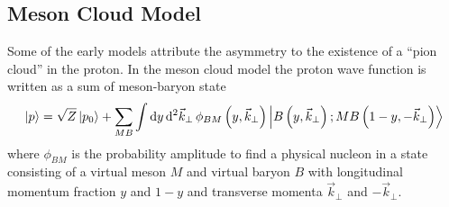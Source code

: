 \documentclass[../main.tex]{subfiles}
\begin{document}
\subsection{Meson Cloud Model}
Some of the early models attribute the asymmetry to the existence of a ``pion cloud'' in the proton.
In the meson cloud model \cite{kumano1998} the proton wave function is written as a sum of meson-baryon state
\begin{equation}
	\ket{p} = \sqrt{Z}\ket{p_0} + \sum_{MB}\int \dd{y} \dd[2]{\vec{k}_\perp} \phi_{BM} \left(y, \vec{k}_\perp\right)\ket{B\left(y, \vec{k}_\perp\right);MB\left(1-y, -\vec{k}_\perp\right)}
\end{equation}
where $\phi_{BM}$ is the probability amplitude to find a physical nucleon in a state consisting of a virtual
meson $M$ and virtual baryon $B$ with longitudinal momentum fraction $y$ and $1-y$ and transverse momenta
$\vec{k}_\perp$ and $-\vec{k}_\perp$.
\end{document}
